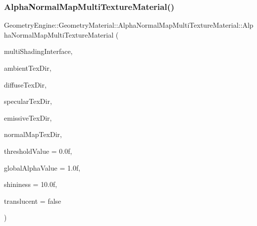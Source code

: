 \subsubsection{\texorpdfstring{AlphaNormalMapMultiTextureMaterial()}{AlphaNormalMapMultiTextureMaterial()}\hspace{0.1cm}{\footnotesize\ttfamily [1/2]}}
{\footnotesize\ttfamily Geometry\+Engine\+::\+Geometry\+Material\+::\+Alpha\+Normal\+Map\+Multi\+Texture\+Material\+::\+Alpha\+Normal\+Map\+Multi\+Texture\+Material (\begin{DoxyParamCaption}\item[{const \mbox{\hyperlink{class_geometry_engine_1_1_custom_shading_1_1_multi_shading_interface}{Custom\+Shading\+::\+Multi\+Shading\+Interface}} $\ast$const}]{multi\+Shading\+Interface,  }\item[{const std\+::string \&}]{ambient\+Tex\+Dir,  }\item[{const std\+::string \&}]{diffuse\+Tex\+Dir,  }\item[{const std\+::string \&}]{specular\+Tex\+Dir,  }\item[{const std\+::string \&}]{emissive\+Tex\+Dir,  }\item[{const std\+::string \&}]{normal\+Map\+Tex\+Dir,  }\item[{float}]{threshold\+Value = {\ttfamily 0.0f},  }\item[{float}]{global\+Alpha\+Value = {\ttfamily 1.0f},  }\item[{float}]{shininess = {\ttfamily 10.0f},  }\item[{bool}]{translucent = {\ttfamily false} }\end{DoxyParamCaption})}

